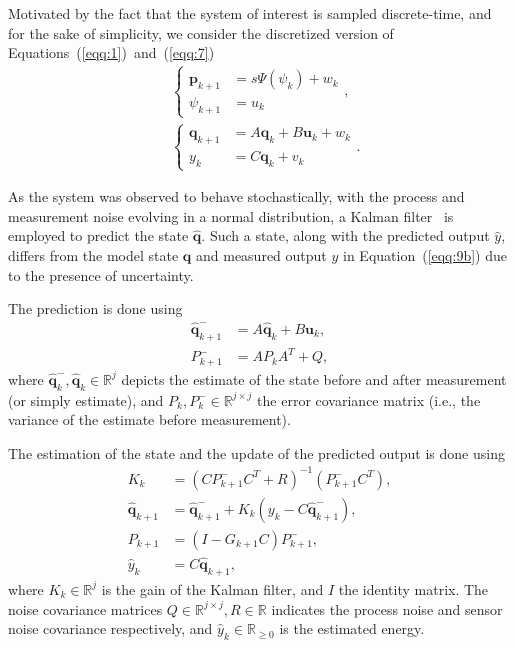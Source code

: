 \documentclass[letterpaper,10pt,conference]{ieeeconf}
\begin{document}
Motivated by the fact that the system of interest is sampled discrete-time, and for the sake of simplicity, we consider the discretized version of Equations~(\ref{eqq:1})~and~(\ref{eqq:7})
\begin{subequations}\label{eqq:9}\begin{align}
  &\begin{cases}\label{eqq:9a}
  \mathbf{p}_{k+1}&=s\Psi(\psi_k)+w_k\\
  \psi_{k+1}&=u_k
  \end{cases},\\
  &\begin{cases}\label{eqq:9b}
  \mathbf{q}_{k+1}&=A\mathbf{q}_{k}+B\mathbf{u}_{k}+w_k\\
  y_k&=C\mathbf{q}_k+v_k
  \end{cases}.
\end{align}\end{subequations}

As the system was observed to behave stochastically, with the process and measurement noise evolving in a normal distribution, a Kalman filter~\cite{stengel1994optimal, simon2006optimal} is employed to predict the state $\hat{\mathbf{q}}$. Such a state, along with the predicted output $\hat{y}$, differs from the model state $\mathbf{q}$ and measured output $y$ in Equation~(\ref{eqq:9b}) due to the presence of uncertainty.

The prediction is done using
\begin{subequations}\label{eqq:10}\begin{align}
  \hat{\mathbf{q}}_{k+1}^-&=A\hat{\mathbf{q}}_{k}+B\mathbf{u}_k,\label{eqq:10a}\\
  P_{k+1}^-&=AP_kA^T+Q,\label{eqq:10b}
\end{align}\end{subequations}
where $\hat{\mathbf{q}}_k^-,\hat{\mathbf{q}}_k\in\mathbb{R}^j$ depicts the estimate of the state before and after measurement (or simply estimate), and $P_k,P_k^-\in\mathbb{R}^{j\times j}$ the error covariance matrix (i.e., the variance of the estimate before measurement). 

The estimation of the state and the update of the predicted output is done using
\begin{subequations}\label{eqq:11}\begin{align}
  K_k&=(CP_{k+1}^-C^T+R)^{-1}(P_{k+1}^-C^T),\\
  \hat{\mathbf{q}}_{k+1}&=\hat{\mathbf{q}}_{k+1}^-+K_k(y_k-C\hat{\mathbf{q}}_{k+1}^-),\label{eqq:11b}\\
  P_{k+1}&=(I-G_{k+1}C)P_{k+1}^-,\\
  \hat{y}_k&=C\hat{\mathbf{q}}_{k+1},\label{eqq:11d}
\end{align}
\end{subequations}
where $K_k\in\mathbb{R}^j$ is the gain of the Kalman filter, and $I$ the identity matrix. The noise covariance matrices $Q\in\mathbb{R}^{j\times j},R\in\mathbb{R}$ indicates the process noise and sensor noise covariance respectively, and $\hat{y}_k\in\mathbb{R}_{\geq 0}$ is the estimated energy.
\end{document}
